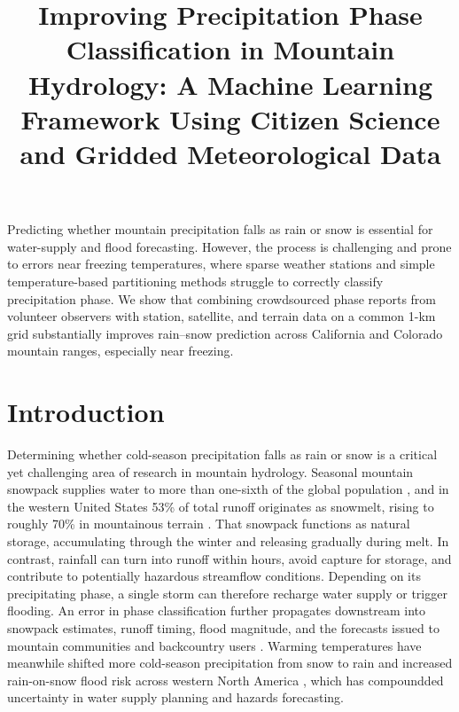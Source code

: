 \documentclass[twocol]{ametsocV6.1} %
\title{Improving Precipitation Phase Classification in Mountain
Hydrology: A Machine Learning Framework Using Citizen Science and
Gridded Meteorological Data}
\affiliation{%
\aff{a}{Lynker Corporation, Louisville, CO}\\
\aff{b}{Desert Research Institute, Reno, NV}\\
\aff{c}{University of Nevada-Reno, NV}\\
\aff{d}{University of Vermont, VT}\\
\aff{e}{Mountain Rain or Snow}}
\begin{document}
\maketitle

\statement
Predicting whether mountain precipitation falls as rain or snow is
essential for water-supply and flood forecasting. However, the process is challenging
and prone to errors near freezing temperatures, where sparse weather stations and simple
temperature-based partitioning methods struggle to correctly classify precipitation phase. 
We show that combining crowdsourced phase reports from volunteer observers 
with station, satellite, and terrain data on a common 1-km grid substantially 
improves rain--snow prediction across California and Colorado mountain ranges, 
especially near freezing.

\section{Introduction}
\label{sec:intro}

Determining whether cold-season precipitation falls as rain or snow is a
critical yet challenging area of research in mountain hydrology.
Seasonal mountain snowpack supplies water to more than one-sixth of the
global population \citep{barnett2005}, and in the western United States
53\% of total runoff originates as snowmelt, rising to roughly 70\% in
mountainous terrain \citep{li2017snowrunoff}. That snowpack functions as
natural storage, accumulating through the winter and releasing gradually
during melt. In contrast, rainfall can turn into runoff within hours, avoid 
capture for storage, and contribute to potentially hazardous streamflow conditions. 
Depending on its precipitating phase, a single
storm can therefore recharge water supply or trigger flooding. An error 
in phase classification further propagates downstream
into snowpack estimates, runoff timing, flood magnitude, and the
forecasts issued to mountain communities and backcountry users
\citep{harpold2017rain, jennings2019sensitivity}. Warming temperatures
have meanwhile shifted more cold-season precipitation from snow to rain and
increased rain-on-snow flood risk across western North America
\citep{musselman2018}, which has compoundded uncertainty in water supply
planning and hazards forecasting.
\end{document}
